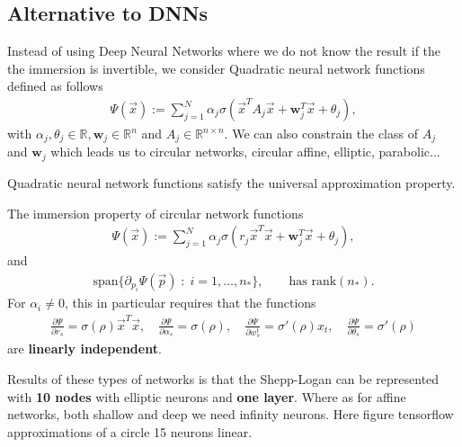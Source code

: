 \subsection{Alternative to DNNs}
Instead of using Deep Neural Networks where we do not know the result if the
the immersion is invertible, we consider Quadratic neural network functions
defined as follows
\begin{align}
    \Psi(\vec{x}) := \sum_{j=1}^{N} \alpha_j\sigma\left(\vec{x}^{T}A_j\vec{x}
        + \mathbf{w}_j^{T}\vec{x} + \theta_j \right),
\end{align}
with $\alpha_j, \theta_j \in \mathbb{R}, \mathbf{w}_j \in \mathbb{R}^{n}$
and $A_j \in \mathbb{R}^{n \times n}$. We can also constrain the class of
$A_j$ and $\mathbf{w}_j$ which leads us to circular networks, circular
affine, elliptic, parabolic...
\begin{theorem}
    Quadratic neural network functions satisfy the universal approximation
    property.
\end{theorem}
The immersion property of circular network functions
\begin{align}
    \Psi(\vec{x}) := \sum_{j=1}^{N} \alpha_j\sigma\left(r_j\vec{x}^{T}\vec{x}
        + \mathbf{w}_j^{T}\vec{x} + \theta_j \right),
\end{align}
and
\begin{align}
    \text{span}\{\partial_{p_i}\Psi(\vec{p})\;:\;i=1,\ldots,n_*\}, \qquad
    \text{has rank}(n_*).
\end{align}
For $\alpha_i \neq 0$, this in particular requires that the functions
\begin{align}
    \frac{\partial \Psi}{\partial r_s}  = \sigma\left( \rho \right)
    \vec{x}^{T}\vec{x}, \quad
    \frac{\partial \Psi}{\partial \alpha_s}  = \sigma\left( \rho \right)
    , \quad
    \frac{\partial \Psi}{\partial w_s^{t}}  = \sigma'\left( \rho \right)
    x_t,\quad
    \frac{\partial \Psi}{\partial \theta_s}  = \sigma'\left( \rho \right)
\end{align}
are \textbf{linearly independent}.
\newline

Results of these types of networks is that the Shepp-Logan can be represented
with \textbf{10 nodes} with elliptic neurons and \textbf{one layer}. Where as
for affine networks, both shallow and deep we need infinity neurons. Here
figure tensorflow approximations of a circle 15 neurons linear.

\appendix
